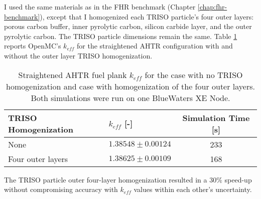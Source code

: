 I used the same materials as in the \gls{FHR} benchmark (Chapter \ref{chap:fhr-benchmark}), 
except that I homogenized each \gls{TRISO} particle's four outer layers: 
porous carbon buffer, inner pyrolytic carbon, silicon carbide layer, and the 
outer pyrolytic carbon. 
The \gls{TRISO} particle dimensions remain the same.
Table \ref{tab:keff_triso} reports OpenMC's $k_{eff}$ for the straightened \gls{AHTR} configuration 
with and without the outer layer \gls{TRISO} homogenization.
\begin{table}[htbp]
    \centering
    \onehalfspacing
    \caption{Straightened \acrfull{AHTR} fuel plank $k_{eff}$ for the case with 
    no \gls{TRISO} homogenization and case with homogenization of the four outer 
    layers. Both simulations were run on one BlueWaters XE Node.}
	\label{tab:keff_triso}
    \footnotesize
    \begin{tabular}{llc}
    \hline 
    \textbf{TRISO Homogenization}& \textbf{$k_{eff}$ [-]} & \textbf{Simulation Time [s]}  \\
    \hline 
    None & $1.38548 \pm 0.00124$ & 233\\ 
    Four outer layers & $1.38625 \pm 0.00109$ & 168\\ 
    \hline
    \end{tabular}
\end{table}

The \gls{TRISO} particle outer four-layer homogenization resulted in a $30\%$ 
speed-up without compromising accuracy with $k_{eff}$ values within each 
other's uncertainty.

